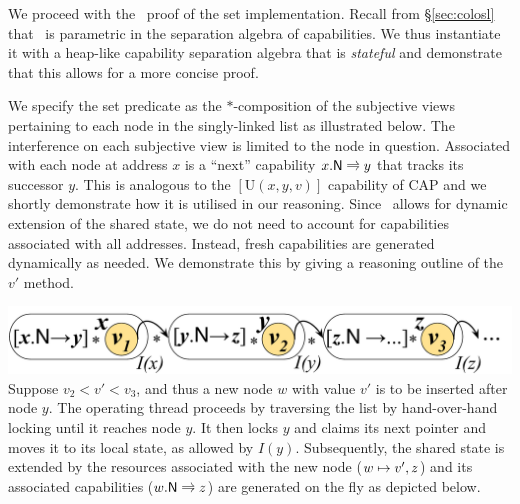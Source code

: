 We proceed with the \colosl\ proof of the set implementation. Recall from \S\ref{sec:colosl} that \colosl\ is parametric in the separation algebra of capabilities. We thus instantiate it with a heap-like capability separation algebra that is \emph{stateful} and demonstrate that this allows for a more concise proof.  

We specify the set predicate as the $*$-composition of the subjective views pertaining to each node in the singly-linked list as illustrated below. The interference on each subjective view is limited to the node in question. Associated with each node at address $x$ is a ``next'' capability $\nextC{x}{y}$ that tracks its successor $y$. This is analogous to the $[\text{U}(x, y, v)]$ capability of CAP and we shortly demonstrate how it is utilised in our reasoning. Since \colosl\ allows for {dynamic} extension of the shared state, we do not need to account for capabilities associated with all addresses. Instead, fresh capabilities are generated dynamically as needed. We demonstrate this by giving a reasoning outline of the $v'$\li{)} method. 

%
{\centering \includegraphics[scale=0.25]{Sections/Examples/Images/coloslSet.pdf}\\}
%
\noindent Suppose $v_2 < v' < v_3$, and thus a new node $w$ with value $v'$ is to be inserted after node $y$.  The operating thread proceeds by traversing the list by hand-over-hand locking until it reaches node $y$. It then locks $y$ and claims its next pointer and moves it to its local state, as allowed by $I(y)$. Subsequently, the shared state is {extended} by the resources associated with the new node ($w \mapsto v', z$) and its associated capabilities ($\nextC{w}{z}$) are generated on the fly as depicted below. \vspace{0pt}

